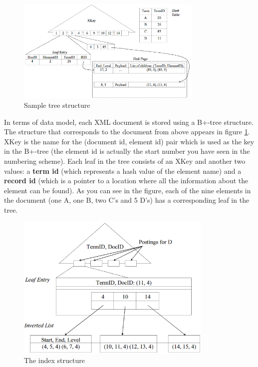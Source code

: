 \documentclass[a4paper,10pt]{article}
\begin{document}
\begin{figure}[ht]
\begin{center}
\includegraphics[width=3.5in]{img/dm.png}
\end{center}
\caption{Sample tree structure}
\label{fig:dm}
\end{figure}

In terms of data model, each XML document is stored using a B+-tree structure. The
structure that corresponds to the document from above appears in figure \ref{fig:dm}.
XKey is the name for the (document id, element id) pair which is used as the key in
the B+-tree (the element id is actually the start number you have seen in the numbering
scheme). Each leaf in the tree consists of an XKey and another two values: a \textbf{term
id} (which represents a hash value of the element name) and a \textbf{record id}
(which is a pointer to a location where all the information about the element can be
found). As you can see in the figure, each of the nine elements in the document (one
A, one B, two C's and 5 D's) has a corresponding leaf in the tree.

\begin{figure}[ht]
\begin{center}
\includegraphics[width=3.7in]{img/im.png}
\end{center}
\caption{The index structure}
\label{fig:im}
\end{figure}
\end{document}
